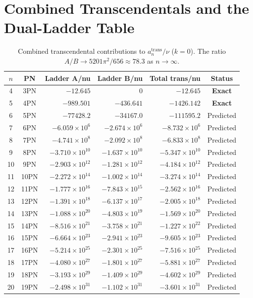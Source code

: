 \documentclass[11pt,a4paper]{article}
\theoremstyle{plain}
\theoremstyle{definition}
\theoremstyle{remark}
\begin{document}
\section{Combined Transcendentals and the Dual-Ladder Table}
\label{sec:combined}

\begin{table}[h]
\centering\small
\renewcommand{\arraystretch}{1.25}
\caption{Combined transcendental contributions to $a_n^{\mathrm{trans}}/\nu$ ($k=0$).
The ratio $A/B \to 5201\pi^2/656 \approx 78.3$ as $n\to\infty$.}
\label{tab:combined}
\begin{tabular}{@{}ccrrrc@{}}
\toprule
$n$ & PN & Ladder A/nu & Ladder B/nu & Total trans/nu & Status \\
\midrule
4 & 3PN & $-12.645$ & $0$ & $-12.645$ & \textcolor{confirmed}{\textbf{Exact}} \\
5 & 4PN & $-989.501$ & $-436.641$ & $-1426.142$ & \textcolor{confirmed}{\textbf{Exact}} \\
6 & 5PN & $-77428.2$ & $-34167.0$ & $-111595.2$ & Predicted \\
7 & 6PN & $-6.059\times10^6$ & $-2.674\times10^6$ & $-8.732\times10^6$ & Predicted \\
8 & 7PN & $-4.741\times10^8$ & $-2.092\times10^8$ & $-6.833\times10^8$ & Predicted \\
9 & 8PN & $-3.710\times10^{10}$ & $-1.637\times10^{10}$ & $-5.347\times10^{10}$ & Predicted \\
10 & 9PN & $-2.903\times10^{12}$ & $-1.281\times10^{12}$ & $-4.184\times10^{12}$ & Predicted \\
11 & 10PN & $-2.272\times10^{14}$ & $-1.002\times10^{14}$ & $-3.274\times10^{14}$ & Predicted \\
12 & 11PN & $-1.777\times10^{16}$ & $-7.843\times10^{15}$ & $-2.562\times10^{16}$ & Predicted \\
13 & 12PN & $-1.391\times10^{18}$ & $-6.137\times10^{17}$ & $-2.005\times10^{18}$ & Predicted \\
14 & 13PN & $-1.088\times10^{20}$ & $-4.803\times10^{19}$ & $-1.569\times10^{20}$ & Predicted \\
15 & 14PN & $-8.516\times10^{21}$ & $-3.758\times10^{21}$ & $-1.227\times10^{22}$ & Predicted \\
16 & 15PN & $-6.664\times10^{23}$ & $-2.941\times10^{23}$ & $-9.605\times10^{23}$ & Predicted \\
17 & 16PN & $-5.214\times10^{25}$ & $-2.301\times10^{25}$ & $-7.516\times10^{25}$ & Predicted \\
18 & 17PN & $-4.080\times10^{27}$ & $-1.801\times10^{27}$ & $-5.881\times10^{27}$ & Predicted \\
19 & 18PN & $-3.193\times10^{29}$ & $-1.409\times10^{29}$ & $-4.602\times10^{29}$ & Predicted \\
20 & 19PN & $-2.498\times10^{31}$ & $-1.102\times10^{31}$ & $-3.601\times10^{31}$ & Predicted \\
\bottomrule
\end{tabular}
\end{table}
\end{document}
